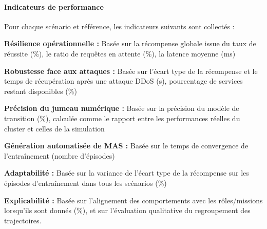 \paragraph{\textbf{Indicateurs de performance}}

\noindent Pour chaque scénario et référence, les indicateurs suivants sont collectés :
%
\begin{enumerate*}[label=\textbf{\arabic*)}, itemjoin={;\quad }]
    \item \textbf{Résilience opérationnelle :} Basée sur la récompense globale issue du taux de réussite (\%), le ratio de requêtes en attente (\%), la latence moyenne (ms)
    \item \textbf{Robustesse face aux attaques :} Basée sur l'écart type de la récompense et le temps de récupération après une attaque DDoS (s), pourcentage de services restant disponibles (\%)
    \item \textbf{Précision du jumeau numérique :} Basée sur la précision du modèle de transition (\%), calculée comme le rapport entre les performances réelles du cluster et celles de la simulation
    \item \textbf{Génération automatisée de MAS :} Basée sur le temps de convergence de l'entraînement (nombre d'épisodes)
    \item \textbf{Adaptabilité :} Basée sur la variance de l'écart type de la récompense sur les épisodes d'entraînement dans tous les scénarios (\%)
    \item \textbf{Explicabilité :} Basée sur l'alignement des comportements avec les rôles/missions lorsqu'ils sont donnés (\%), et sur l'évaluation qualitative du regroupement des trajectoires.
\end{enumerate*}
